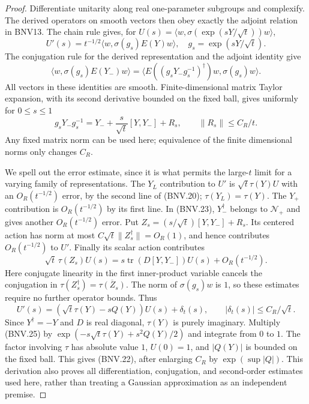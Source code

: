 \documentclass[11pt,a4paper]{article}
\numberwithin{equation}{section}
\theoremstyle{remark}\newtheorem{remark}[theorem]{Remark}
\begin{document}
\begin{proof}
Differentiate unitarity along real one-parameter subgroups and complexify.
The derived operators on smooth vectors then obey exactly the adjoint
relation in BNV13.  The chain rule gives, for
$U(s)=\langle w,\sigma(\exp(sY/\sqrt t))w\rangle$,
\[
 U'(s)=t^{-1/2}\langle w,\sigma(g_s)E(Y)w\rangle,
 \quad g_s=\exp(sY/\sqrt t).
\]
The conjugation rule for the derived representation and the adjoint
identity give
\[
 \langle w,\sigma(g_s)E(Y_-)w\rangle
 =\langle E((g_sY_-g_s^{-1})^\dagger)w,\sigma(g_s)w\rangle.
 \tag{BNV.23}
\]
All vectors in these identities are smooth.  Finite-dimensional matrix
Taylor expansion, with its second derivative bounded on the fixed ball,
gives uniformly for $0\le s\le1$
\[
 g_sY_-g_s^{-1}
   =Y_-+\frac{s}{\sqrt t}[Y,Y_-]+R_s,
 \qquad \|R_s\|\le C_R/t.
 \tag{BNV.24}
\]
Any fixed matrix norm can be used here; equivalence of the finite
dimensional norms only changes $C_R$.

We spell out the error estimate, since it is what permits the large-$t$
limit for a varying family of representations.  The $Y_L$ contribution
to $U'$ is $\sqrt t\tau(Y)U$ with an $O_R(t^{-1/2})$ error, by the
second line of (BNV.20); $\tau(Y_L)=\tau(Y)$.
The $Y_+$ contribution is $O_R(t^{-1/2})$ by its first line.  In
(BNV.23), $Y_-^\dagger$ belongs to $\mathcal N_+$ and gives another
$O_R(t^{-1/2})$ error.  Put $Z_s=(s/\sqrt t)[Y,Y_-]+R_s$.
Its centered action has norm at most
$C\sqrt t\|Z_s^\dagger\|=O_R(1)$, and hence contributes
$O_R(t^{-1/2})$ to $U'$.  Finally its scalar action contributes
\[
 \sqrt t\,\tau(Z_s)U(s)
   =s\operatorname{tr}(D[Y,Y_-])U(s)+O_R(t^{-1/2}).
\]
Here conjugate linearity in the first inner-product variable cancels the
conjugation in $\tau(Z_s^\dagger)=\overline{\tau(Z_s)}$.
The norm of $\sigma(g_s)w$ is $1$, so these estimates require no further
operator bounds.  Thus
\[
 U'(s)=(\sqrt t\tau(Y)-sQ(Y))U(s)+\delta_t(s),
 \qquad |\delta_t(s)|\le C_R/\sqrt t.
 \tag{BNV.25}
\]
Since $Y^\dagger=-Y$ and $D$ is real diagonal, $\tau(Y)$ is purely
imaginary.  Multiply (BNV.25) by
$\exp(-s\sqrt t\tau(Y)+s^2Q(Y)/2)$ and integrate from $0$ to $1$.
The factor involving $\tau$ has absolute value $1$, $U(0)=1$, and
$|Q(Y)|$ is bounded on the fixed ball.  This gives (BNV.22), after
enlarging $C_R$ by $\exp(\sup|Q|)$.  This derivation also proves all
differentiation, conjugation, and second-order estimates used here,
rather than treating a Gaussian approximation as an independent premise.
\end{proof}
\end{document}
